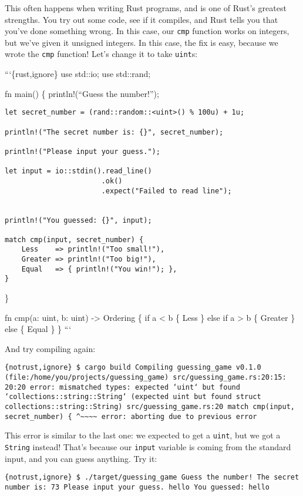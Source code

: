 \documentclass[]{article}
\begin{document}
This often happens when writing Rust programs, and is one of Rust's
greatest strengths. You try out some code, see if it compiles, and Rust
tells you that you've done something wrong. In this case, our
\texttt{cmp} function works on integers, but we've given it unsigned
integers. In this case, the fix is easy, because we wrote the
\texttt{cmp} function! Let's change it to take \texttt{uint}s:

```\{rust,ignore\} use std::io; use std::rand;

fn main() \{ println!(``Guess the number!'');

\begin{verbatim}
let secret_number = (rand::random::<uint>() % 100u) + 1u;

println!("The secret number is: {}", secret_number);

println!("Please input your guess.");

let input = io::stdin().read_line()
                       .ok()
                       .expect("Failed to read line");


println!("You guessed: {}", input);

match cmp(input, secret_number) {
    Less    => println!("Too small!"),
    Greater => println!("Too big!"),
    Equal   => { println!("You win!"); },
}
\end{verbatim}

\}

fn cmp(a: uint, b: uint) -\textgreater{} Ordering \{ if a \textless{} b
\{ Less \} else if a \textgreater{} b \{ Greater \} else \{ Equal \} \}
```

And try compiling again:

\texttt{\{notrust,ignore\} \$ cargo build    Compiling guessing\_game v0.1.0 (file:/home/you/projects/guessing\_game) src/guessing\_game.rs:20:15: 20:20 error: mismatched types: expected `uint` but found `collections::string::String` (expected uint but found struct collections::string::String) src/guessing\_game.rs:20     match cmp(input, secret\_number) \{                                       \^{}\textasciitilde{}\textasciitilde{}\textasciitilde{}\textasciitilde{} error: aborting due to previous error}

This error is similar to the last one: we expected to get a
\texttt{uint}, but we got a \texttt{String} instead! That's because our
\texttt{input} variable is coming from the standard input, and you can
guess anything. Try it:

\texttt{\{notrust,ignore\} \$ ./target/guessing\_game  Guess the number! The secret number is: 73 Please input your guess. hello You guessed: hello}
\end{document}
